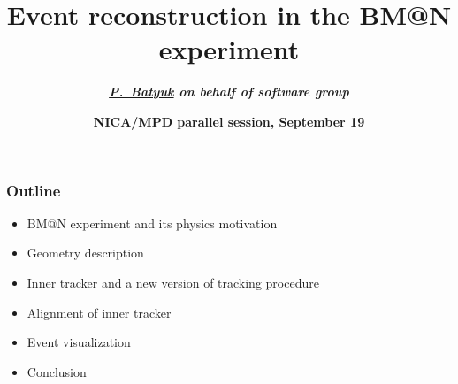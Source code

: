 \documentclass[dvipsnames, aspectratio=43] {beamer}
\title[\bf The XXIV International Baldin Seminar on High Energy Physics Problems]{\textbf{\large {Event reconstruction in the BM@N experiment}}}
\author[\bf P.~Batyuk]{\textit{\textbf{{\footnotesize \underline{P.~Batyuk} on behalf of software group}}}}
\institute{\bf Dubna, Joint Institute for Nuclear Research}
\date{{\textbf{NICA/MPD parallel session, September 19}}}
\begin{document}
\maketitle

\begin{frame}
  \bf
  \frametitle{\bf \centering Outline}
  \begin{itemize}
  \item BM@N experiment and its physics motivation
  \item Geometry description
  \item Inner tracker and a new version of tracking procedure
  \item Alignment of inner tracker
  \item Event visualization
  \item Conclusion
  \end{itemize}
\end{frame}
\end{document}
